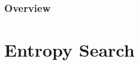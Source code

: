 \documentclass[10pt,handout]{beamer}
\begin{document}





%
%
%



\begin{frame}
\frametitle{Overview} %
\tableofcontents %
\end{frame}



\section{Entropy Search}
\end{document}
